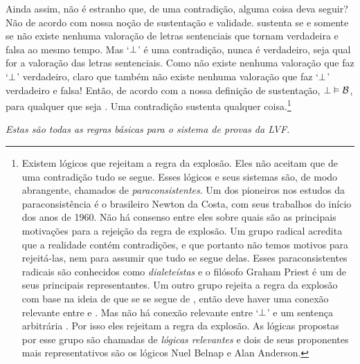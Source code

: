Ainda assim, não é estranho que, de uma contradição, alguma coisa deva seguir? Não de acordo com nossa noção de sustentação e validade.  sustenta  se e somente se não existe nenhuma valoração de letras sentenciais que tornam  verdadeira e  falsa ao mesmo tempo. Mas `$\bot$' é uma contradição, nunca é verdadeiro, seja qual for a valoração das letras sentenciais.  Como não existe nenhuma valoração que faz  `$\bot$' verdadeiro, claro que também não existe nenhuma valoração que faz  `$\bot$'  verdadeiro e  falsa! Então, de acordo com a nossa definição de sustentação,  $\bot \vDash \mathcal{B}$,  para qualquer que seja . Uma contradição sustenta qualquer coisa.\footnote{
	Existem lógicos que rejeitam a regra da explosão. Eles não aceitam que de uma contradição tudo se segue. Esses lógicos e seus sistemas são, de modo abrangente, chamados de \textit{paraconsistentes}. Um dos pioneiros nos estudos da paraconsistência  é o brasileiro Newton da Costa, com seus trabalhos do início dos anos de 1960. Não há consenso entre eles sobre quais são as principais motivações para a rejeição da regra de explosão. Um grupo radical acredita que a realidade contém contradições, e que portanto não temos motivos para rejeitá-las, nem para assumir que tudo se segue delas. Esses paraconsistentes radicais são conhecidos como \textit{dialeteístas} e o filósofo Graham Priest é um de seus principais representantes. Um outro grupo rejeita a regra da explosão com base na ideia de que se  se segue de , então deve haver uma conexão relevante entre  e . Mas não há conexão relevante entre `$\bot$' e um sentença arbitrária . Por isso eles rejeitam a regra da explosão. As lógicas propostas por esse grupo são chamadas de \textit{lógicas relevantes} e dois de seus proponentes mais representativos são os lógicos Nuel Belnap e Alan Anderson.}

\emph{Estas são todas as regras básicas para o sistema de provas da LVF.}


\practiceproblems

